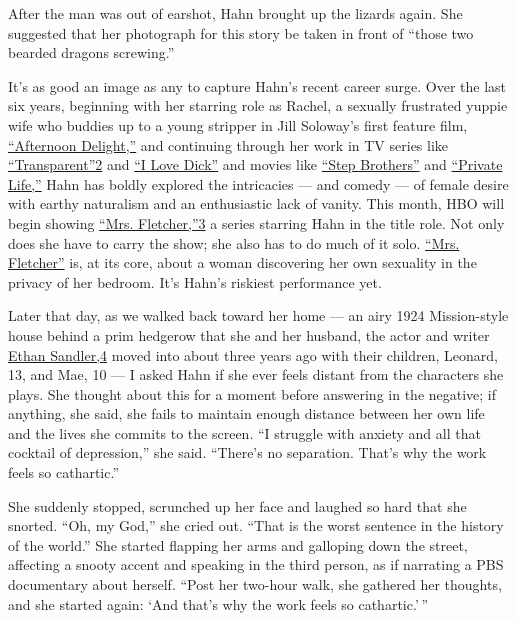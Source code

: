 After the man was out of earshot, Hahn brought up the lizards again. She
suggested that her photograph for this story be taken in front of
``those two bearded dragons screwing.''

It's as good an image as any to capture Hahn's recent career surge. Over
the last six years, beginning with her starring role as Rachel, a
sexually frustrated yuppie wife who buddies up to a young stripper in
Jill Soloway's first feature film,
\href{https://www.nytimes3xbfgragh.onion/2013/08/30/movies/bored-housewife-searches-for-a-spark-in-afternoon-delight.html}{``Afternoon
Delight,''} and continuing through her work in TV series like
\href{http://nytimes3xbfgragh.onion\#tooltip-2}{``Transparent''2} and
\href{https://www.nytimes3xbfgragh.onion/2017/05/11/arts/television/i-love-dick-amazon-review.html}{``I
Love Dick''} and movies like
\href{https://www.nytimes3xbfgragh.onion/2018/11/01/movies/will-ferrell-john-c-reilly-holmes-watson.html}{``Step
Brothers''} and
\href{https://www.nytimes3xbfgragh.onion/2018/10/04/movies/private-life-review-kathryn-hahn-paul-giamatti.html}{``Private
Life,''} Hahn has boldly explored the intricacies --- and comedy --- of
female desire with earthy naturalism and an enthusiastic lack of vanity.
This month, HBO will begin showing
\href{http://nytimes3xbfgragh.onion\#tooltip-3}{``Mrs. Fletcher,''3} a
series starring Hahn in the title role. Not only does she have to carry
the show; she also has to do much of it solo.
\href{https://www.nytimes3xbfgragh.onion/2017/08/01/books/review/mrs-fletcher-tom-perrotta.html}{``Mrs.
Fletcher''} is, at its core, about a woman discovering her own sexuality
in the privacy of her bedroom. It's Hahn's riskiest performance yet.

Later that day, as we walked back toward her home --- an airy 1924
Mission-style house behind a prim hedgerow that she and her husband, the
actor and writer \href{http://nytimes3xbfgragh.onion\#tooltip-4}{Ethan
Sandler,4} moved into about three years ago with their children,
Leonard, 13, and Mae, 10 --- I asked Hahn if she ever feels distant from
the characters she plays. She thought about this for a moment before
answering in the negative; if anything, she said, she fails to maintain
enough distance between her own life and the lives she commits to the
screen. ``I struggle with anxiety and all that cocktail of depression,''
she said. ``There's no separation. That's why the work feels so
cathartic.''

She suddenly stopped, scrunched up her face and laughed so hard that she
snorted. ``Oh, my God,'' she cried out. ``That is the worst sentence in
the history of the world.'' She started flapping her arms and galloping
down the street, affecting a snooty accent and speaking in the third
person, as if narrating a PBS documentary about herself. ``Post her
two-hour walk, she gathered her thoughts, and she started again: `And
that's why the work feels so cathartic.' ''


